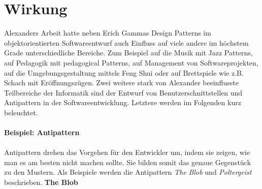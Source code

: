 \documentclass[fontsize=11pt,a4paper,final]{scrreprt}[2003/01/01]
\begin{document}
\section{Wirkung}
Alexanders Arbeit hatte neben Erich Gammas Design Patterns im objektorientierten Softwareentwurf auch Einfluss auf viele andere im höchstem Grade unterschiedliche Bereiche. Zum Beispiel auf die Musik mit Jazz Patterns, auf Pedagogik mit pedagogical Patterns, auf Management von Softwareprojekten, auf die Umgebungsgestaltung mittels Feng Shui oder auf Brettspiele wie z.B. Schach mit Eröffnungszügen. Zwei weitere stark von Alexander beeinflusste Teilbereiche der Informatik sind der Entwurf von Benutzerschnittstellen und Antipattern in der Softwareentwicklung. Letztere werden im Folgenden kurz beleuchtet. \\ \\
\textbf{Beispiel: Antipattern} \\ \\
Antipattern drehen das Vorgehen für den Entwickler um, indem sie zeigen, wie man es am besten nicht machen sollte. Sie bilden somit das genaue Gegenstück zu den Mustern. Als Beispiele werden die Antipattern \textit{The Blob} und \textit{Poltergeist} beschrieben. \newpage
\textbf{The Blob \cite[S. 42 - 48]{Brown1998}}
\end{document}
